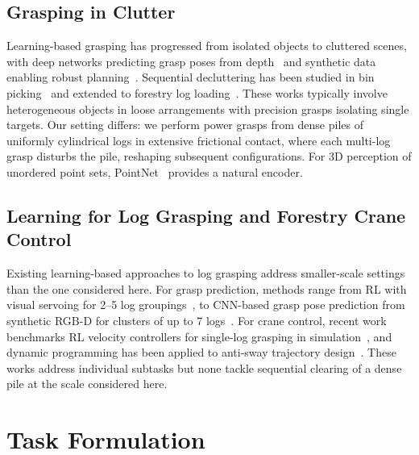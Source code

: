 \documentclass[conference]{IEEEtran}
\begin{document}
\subsection{Grasping in Clutter}
Learning-based grasping has progressed from isolated objects to cluttered scenes, with deep networks predicting grasp poses from depth~\cite{morrison2018closing, kumra2017robotic} and synthetic data enabling robust planning~\cite{mahler2017dexnet}.
Sequential decluttering has been studied in bin picking~\cite{mahler2017sequential, zeng2018learning} and extended to forestry log loading~\cite{wallin2024multilog}.
These works typically involve heterogeneous objects in loose arrangements with precision grasps isolating single targets.
Our setting differs: we perform power grasps from dense piles of uniformly cylindrical logs in extensive frictional contact, where each multi-log grasp disturbs the pile, reshaping subsequent configurations.
For 3D perception of unordered point sets, PointNet~\cite{qi2017pointnet} provides a natural encoder.

\subsection{Learning for Log Grasping and Forestry Crane Control}
Existing learning-based approaches to log grasping address smaller-scale settings than the one considered here.
For grasp prediction, methods range from RL with visual servoing for 2--5 log groupings~\cite{wallin2024multilog}, to CNN-based grasp pose prediction from synthetic RGB-D for clusters of up to 7 logs~\cite{falldin2025synthesizing, ayoub2023grasp}.
For crane control, recent work benchmarks RL velocity controllers for single-log grasping in simulation~\cite{vu2025autonomous, kurinov2025reinforcement}, and dynamic programming has been applied to anti-sway trajectory design~\cite{jebellat2025designing}.
These works address individual subtasks but none tackle sequential clearing of a dense pile at the scale considered here.

\section{Task Formulation}
\end{document}
